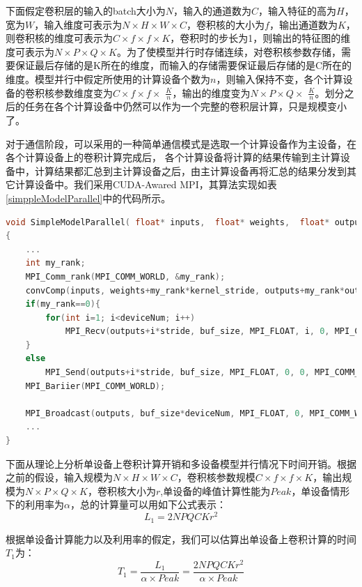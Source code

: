 下面假定卷积层的输入的batch大小为$N$，输入的通道数为$C$，输入特征的高为$H$，宽为$W$，输入维度可表示为$N\times H\times W\times C$，卷积核的大小为$f$，输出通道数为$K$，则卷积核的维度可表示为$C\times f\times f\times K$，卷积时的步长为1，则输出的特征图的维度可表示为$N\times P\times Q\times K$。为了使模型并行时存储连续，对卷积核参数存储，需要保证最后存储的是K所在的维度，而输入的存储需要保证最后存储的是C所在的维度。模型并行中假定所使用的计算设备个数为$n$，则输入保持不变，各个计算设备的卷积核参数维度变为$C\times f\times f\times$ $\frac{K}{n}$，输出的维度变为$N\times P\times Q\times$ $\frac{K}{n}$。划分之后的任务在各个计算设备中仍然可以作为一个完整的卷积层计算，只是规模变小了。

对于通信阶段，可以采用的一种简单通信模式是选取一个计算设备作为主设备，在各个计算设备上的卷积计算完成后，
各个计算设备将计算的结果传输到主计算设备中，计算结果都汇总到主计算设备之后，由主计算设备再将汇总的结果分发到其它计算设备中。我们采用CUDA-Awared MPI，其算法实现如表\ref{simppleModelParallel}中的代码所示。

\begin{table}
\caption{基于多设备上的模型并行简单实现}
\label{simppleModelParallel}
\begin{lstlisting}[language=C++, basicstyle=\ttfamily\footnotesize]
void SimpleModelParallel( float* inputs,  float* weights,  float* outputs,  int N, int buf_size, int deviceNum, int kernel_stride, int output_stride... )
{
	...
	int my_rank;
	MPI_Comm_rank(MPI_COMM_WORLD, &my_rank);
	convComp(inputs, weights+my_rank*kernel_stride, outputs+my_rank*output_stride);
	if(my_rank==0){
		for(int i=1; i<deviceNum; i++)
			MPI_Recv(outputs+i*stride, buf_size, MPI_FLOAT, i, 0, MPI_COMM_WORLD );
	}
	else
		MPI_Send(outputs+i*stride, buf_size, MPI_FLOAT, 0, 0, MPI_COMM_WORLD);
	MPI_Bariier(MPI_COMM_WORLD);
	
	MPI_Broadcast(outputs, buf_size*deviceNum, MPI_FLOAT, 0, MPI_COMM_WORLD);
	...
}
\end{lstlisting}
\end{table}

下面从理论上分析单设备上卷积计算开销和多设备模型并行情况下时间开销。根据之前的假设，输入规模为$N\times H\times W\times C$，卷积核参数规模$C\times f\times f\times K$，输出规模为$N\times P\times Q\times K$，卷积核大小为$r$,单设备的峰值计算性能为$Peak$，单设备情形下的利用率为$\alpha$，总的计算量可以用如下公式表示：
\begin{equation}
L_1 = 2NPQCKr^2
\end{equation}

根据单设备计算能力以及利用率的假定，我们可以估算出单设备上卷积计算的时间$T_1$为：
\begin{equation}
T_1 = \frac{L_1}{\alpha \times Peak} = \frac{2NPQCKr^2}{\alpha \times Peak}
\end{equation}

